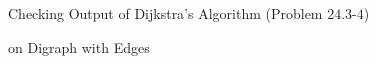 \begin{frame}{}
  \begin{exampleblock}{Checking Output of Dijkstra's Algorithm (Problem $24.3$-$4$)}
  \end{exampleblock}
\end{frame}

\begin{frame}{}
\end{frame}

\begin{frame}{}
  \begin{center}

     on Digraph with  Edges \\[30pt]

  \end{center}
\end{frame}
